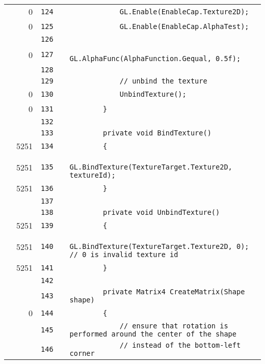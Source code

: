 \documentclass[a4paper,landscape,10pt]{article}
\begin{document}
\begin{longtable}[l]{lrrll}
\cellcolor{red} & 0 & \verb~124~ & & \verb~            GL.Enable(EnableCap.Texture2D);~\\
\cellcolor{red} & 0 & \verb~125~ & & \verb~            GL.Enable(EnableCap.AlphaTest);~\\
\cellcolor{gray} &  & \verb~126~ & & \verb~~\\
\cellcolor{red} & 0 & \verb~127~ & & \verb~            GL.AlphaFunc(AlphaFunction.Gequal, 0.5f);~\\
\cellcolor{gray} &  & \verb~128~ & & \verb~~\\
\cellcolor{gray} &  & \verb~129~ & & \verb~            // unbind the texture~\\
\cellcolor{red} & 0 & \verb~130~ & & \verb~            UnbindTexture();~\\
\cellcolor{red} & 0 & \verb~131~ & & \verb~        }~\\
\cellcolor{gray} &  & \verb~132~ & & \verb~~\\
\cellcolor{gray} &  & \verb~133~ & & \verb~        private void BindTexture()~\\
\cellcolor{green} & 5251 & \verb~134~ & & \verb~        {~\\
\cellcolor{green} & 5251 & \verb~135~ & & \verb~            GL.BindTexture(TextureTarget.Texture2D, textureId);~\\
\cellcolor{green} & 5251 & \verb~136~ & & \verb~        }~\\
\cellcolor{gray} &  & \verb~137~ & & \verb~~\\
\cellcolor{gray} &  & \verb~138~ & & \verb~        private void UnbindTexture()~\\
\cellcolor{green} & 5251 & \verb~139~ & & \verb~        {~\\
\cellcolor{green} & 5251 & \verb~140~ & & \verb~            GL.BindTexture(TextureTarget.Texture2D, 0); // 0 is invalid texture id~\\
\cellcolor{green} & 5251 & \verb~141~ & & \verb~        }~\\
\cellcolor{gray} &  & \verb~142~ & & \verb~~\\
\cellcolor{gray} &  & \verb~143~ & & \verb~        private Matrix4 CreateMatrix(Shape shape)~\\
\cellcolor{red} & 0 & \verb~144~ & & \verb~        {~\\
\cellcolor{gray} &  & \verb~145~ & & \verb~            // ensure that rotation is performed around the center of the shape~\\
\cellcolor{gray} &  & \verb~146~ & & \verb~            // instead of the bottom-left corner~\\

\end{longtable}
\end{document}
